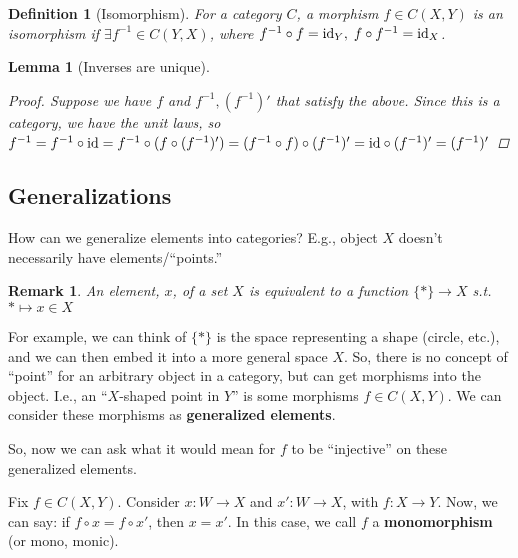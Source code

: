 \documentclass[12pt]{article}
\newtheorem{lemma}{Lemma}
\newtheorem{remark}[theorem]{Remark}
\newtheorem{definition}{Definition}
\begin{document}
\begin{definition}[Isomorphism]
    For a category $C$, a morphism $f \in C(X,Y)$ is an isomorphism if $\exists f^{-1} \in C(Y,X)$, where $f^{-1} \circ f = \textmd{id}_Y, \; f\circ f^{-1} = \textmd{id}_X$.
\end{definition}

\begin{lemma}[Inverses are unique]
    \begin{proof}
        Suppose we have $f$ and $f^{-1},(f^{-1})'$ that satisfy the above. Since this is a category, we have the unit laws, so $f^{-1} =f^{-1} \circ \textmd{id} =f^{-1} \circ (f \circ (f^{-1})') = (f^{-1} \circ f) \circ (f^{-1})' = \textmd{id} \circ (f^{-1})' = (f^{-1})'$
    \end{proof}
\end{lemma}

\subsection{Generalizations}

How can we generalize elements into categories? E.g., object $X$ doesn't necessarily have elements/``points.''

\begin{remark}
    An element, $x$, of a set $X$ is equivalent to a function $\{\ast\} \rightarrow X$ s.t. $\ast \mapsto x \in X$
\end{remark}

For example, we can think of $\{\ast\}$ is the space representing a shape (circle, etc.), and we can then embed it into a more general space $X$. So, there is no concept of ``point'' for an arbitrary object in a category, but can get morphisms into the object. I.e., an ``$X$-shaped point in $Y$'' is some morphisms $f \in C(X,Y)$. We can consider these morphisms as \textbf{generalized elements}.

\vspace{5mm}

So, now we can ask what it would mean for $f$ to be ``injective'' on these generalized elements.

\vspace{5mm}

Fix $f \in C(X,Y)$. Consider $x:W \rightarrow X$ and $x':W \rightarrow X$, with $f:X\rightarrow Y$. Now, we can say: if $f \circ x = f \circ x'$, then $x = x'$. In this case, we call $f$ a \textbf{monomorphism} (or mono, monic).
\end{document}
